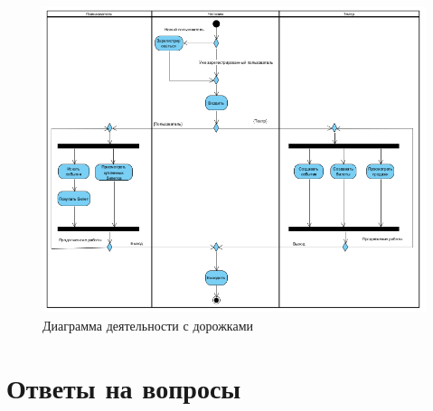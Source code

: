 \begin{figure}[h!tp]
	\centering
	\includegraphics[width=1\textwidth]{img}
	\caption{Диаграмма деятельности с дорожками}
	\label{fig:activity}
\end{figure}


\clearpage

\section*{Ответы на вопросы}

